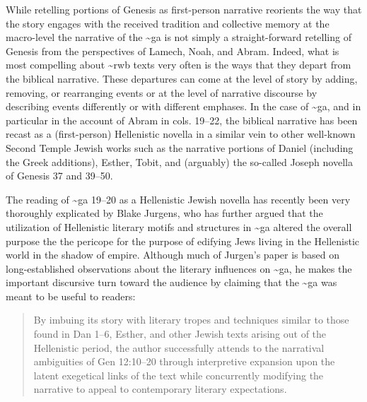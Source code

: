 While retelling portions of Genesis as first-person narrative reorients
the way that the story engages with the received tradition and
collective memory at the macro-level the narrative of the
\textasciitilde{}ga is not simply a straight-forward retelling of
Genesis from the perspectives of Lamech, Noah, and Abram. Indeed, what
is most compelling about \textasciitilde{}rwb texts very often is the
ways that they depart from the biblical narrative. These departures can
come at the level of story by adding, removing, or rearranging events or
at the level of narrative discourse by describing events differently or
with different emphases. In the case of \textasciitilde{}ga, and in
particular in the account of Abram in cols. 19--22, the biblical
narrative has been recast as a (first-person) Hellenistic novella in a
similar vein to other well-known Second Temple Jewish works such as the
narrative portions of Daniel (including the Greek additions), Esther,
Tobit, and (arguably) the so-called Joseph novella of Genesis 37 and
39--50.\autocites*[See especially Lawrence Wills work on the Jewish
novels and novellas in antiquity:][]{wills2002}[as well as his important
earlier works:][]{wills1995}[and][]{wills1990}

The reading of \textasciitilde{}ga 19--20 as a Hellenistic Jewish
novella has recently been very thoroughly explicated by Blake Jurgens,
who has further argued that the utilization of Hellenistic literary
motifs and structures in \textasciitilde{}ga altered the overall purpose
the the pericope for the purpose of edifying Jews living in the
Hellenistic world in the shadow of empire.\autocite{jurgens_jsj2018}
Although much of Jurgen's paper is based on long-established
observations about the literary influences on \textasciitilde{}ga, he
makes the important discursive turn toward the audience by claiming that
the \textasciitilde{}ga was meant to be useful to readers:

\begin{quote}
By imbuing its story with literary tropes and techniques similar to
those found in Dan 1--6, Esther, and other Jewish texts arising out of
the Hellenistic period, the author successfully attends to the
narratival ambiguities of Gen 12:10--20 through interpretive expansion
upon the latent exegetical links of the text while concurrently
modifying the narrative to appeal to contemporary literary
expectations.\autocite[27]{jurgens_jsj2018}
\end{quote}

